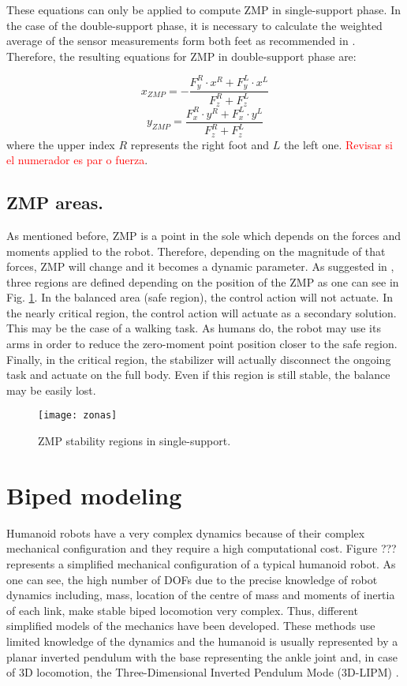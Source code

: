 These equations can only be applied to compute ZMP in single-support phase. In the case of the double-support phase, it is necessary to calculate the weighted average of the sensor measurements form both feet as recommended in \cite{Kaj2005}. Therefore, the resulting equations for ZMP in double-support phase are:

\begin{equation}
x_{ZMP} = -\frac{F_{y}^{R}\cdot x^{R}+F_{y}^{L}\cdot x^{L}}{F_{z}^{R}+F_{z}^{L}}
\end{equation}
\begin{equation}
y_{ZMP} = \frac{F_{x}^{R}\cdot y^{R}+F_{x}^{L}\cdot y^{L}}{F_{z}^{R}+F_{z}^{L}}
\end{equation}
where the upper index $R$ represents the right foot and $L$ the left one.
\textcolor{red}{Revisar si el numerador es par o fuerza}.

\subsection{ZMP areas.}
As mentioned before, ZMP is a point in the sole which depends on the forces and moments applied to the robot. Therefore, depending on the magnitude of that forces, ZMP will change and it becomes a dynamic parameter. As suggested in \cite{Vuk}, three regions are defined depending on the position of the ZMP as one can see in Fig. \ref{fig:zonas}.
In the balanced area (safe region), the control action will not actuate. In the nearly critical region, the control action will actuate as a secondary solution. This may be the case of a walking task. As humans do, the robot may use its arms in order to reduce the zero-moment point position closer to the safe region. Finally, in the critical region, the stabilizer will actually disconnect the ongoing task and actuate on the full body. Even if this region is still stable, the balance may be easily lost. 


\begin{figure}[!hbt]
\centering
\texttt{[image: zonas]}
\caption{ZMP stability regions in single-support.}
\label{fig:zonas}
\end{figure}



\section{Biped modeling}
Humanoid robots have a very complex dynamics because of their complex mechanical configuration and they require a high computational cost. Figure ??? represents a simplified mechanical configuration of a typical humanoid robot. As one can see, the high number of DOFs due to the precise knowledge of robot dynamics including, mass, location of the centre of mass and moments of inertia of each link, make stable biped locomotion very complex. Thus, different simplified models of the mechanics have been developed. These methods use limited knowledge of the dynamics and the humanoid is usually represented by a planar inverted pendulum with the base representing the ankle joint and, in case of 3D locomotion, the Three-Dimensional Inverted Pendulum Mode (3D-LIPM) \cite{Kaj2001}.
